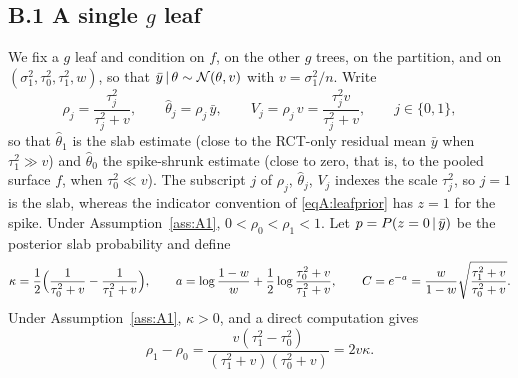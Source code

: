 \subsection*{B.1 A single $g$ leaf}

We fix a $g$ leaf and condition on $f$, on the other $g$ trees, on the partition, and on $(\sigma_1^2,\tau_0^2,\tau_1^2,w)$, so that $\bar y\,\vert\,\theta\sim\mathcal{N}(\theta,v)$ with $v=\sigma_1^2/n$. Write
\begin{equation}
\rho_j=\frac{\tau_j^2}{\tau_j^2+v},\qquad \hat\theta_j=\rho_j\,\bar y,\qquad V_j=\rho_j\,v=\frac{\tau_j^2v}{\tau_j^2+v},\qquad j\in\{0,1\},
\label{eq:rho}
\end{equation}
so that $\hat\theta_1$ is the slab estimate (close to the RCT-only residual mean $\bar y$ when $\tau_1^2\gg v$) and $\hat\theta_0$ the spike-shrunk estimate (close to zero, that is, to the pooled surface $f$, when $\tau_0^2\ll v$). The subscript $j$ of $\rho_j$, $\hat\theta_j$, $V_j$ indexes the scale $\tau_j^2$, so $j=1$ is the slab, whereas the indicator convention of \eqref{eqA:leafprior} has $z=1$ for the spike. Under Assumption~\ref{ass:A1}, $0<\rho_0<\rho_1<1$. Let $p=P(z=0\,\vert\,\bar y)$ be the posterior slab probability and define
\begin{equation}
\kappa=\frac12\Bigl(\frac{1}{\tau_0^2+v}-\frac{1}{\tau_1^2+v}\Bigr),\qquad
a=\log\frac{1-w}{w}+\frac12\log\frac{\tau_0^2+v}{\tau_1^2+v},\qquad
C=e^{-a}=\frac{w}{1-w}\sqrt{\frac{\tau_1^2+v}{\tau_0^2+v}}.
\label{eq:kappaC}
\end{equation}
Under Assumption~\ref{ass:A1}, $\kappa>0$, and a direct computation gives
\begin{equation}
\rho_1-\rho_0=\frac{v(\tau_1^2-\tau_0^2)}{(\tau_1^2+v)(\tau_0^2+v)}=2v\kappa .
\label{eq:rhodiff}
\end{equation}


